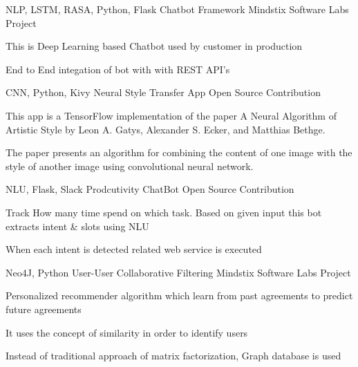 \begin{cventries}
    \cventry
    {NLP, LSTM, RASA, Python, Flask} %
    {Chatbot Framework} %
    {Mindstix Software Labs Project} %
    {} %
    {
      \begin{cvitems} %
        \item {This is Deep Learning based Chatbot used by customer in production}
        \item {End to End integation of bot with with REST API's }
      \end{cvitems}
    }
    
    \cventry
    {CNN, Python, Kivy} %
    {Neural Style Transfer App} %
    {Open Source Contribution} %
    {} %
    {
      \begin{cvitems} %
        \item {This app is a TensorFlow implementation of the paper A Neural Algorithm of Artistic Style by Leon A. Gatys, Alexander S. Ecker, and Matthias Bethge.}
        \item {The paper presents an algorithm for combining the content of one image with the style of another image using convolutional neural network.}
      \end{cvitems}
    }
  
  \cventry
    {NLU, Flask, Slack} %
    {Prodcutivity ChatBot} %
    {Open Source Contribution} %
    {} %
    {
      \begin{cvitems} %
        \item {Track How many time spend on which task. Based on given input this bot extracts intent \& slots using NLU}
        \item {When each intent is detected related web service is executed}
      \end{cvitems}
    }

   \cventry
    {Neo4J, Python} %
    {User-User Collaborative Filtering} %
    {Mindstix Software Labs Project} %
    {} %
    {
      \begin{cvitems} %
        \item {Personalized recommender algorithm which learn from past agreements to predict future agreements}
        \item {It uses the concept of similarity in order to identify users}
        \item {Instead of traditional approach of matrix factorization, Graph database is used}
      \end{cvitems}
    }
  

\end{cventries}
